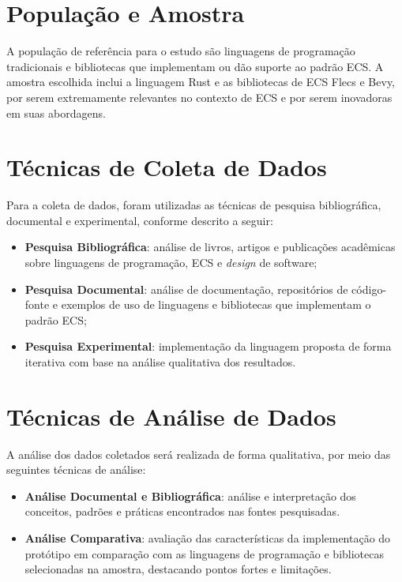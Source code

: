 \section{População e Amostra}

A população de referência para o estudo são linguagens de programação tradicionais e bibliotecas que implementam ou dão suporte ao padrão ECS. A amostra escolhida inclui a linguagem Rust e as bibliotecas de ECS Flecs e Bevy, por serem extremamente relevantes no contexto de ECS e por serem inovadoras em suas abordagens.

\section{Técnicas de Coleta de Dados}

Para a coleta de dados, foram utilizadas as técnicas de pesquisa bibliográfica, documental e experimental, conforme descrito a seguir:

\begin{itemize}
    \item \textbf{Pesquisa Bibliográfica}: análise de livros, artigos e publicações acadêmicas sobre linguagens de programação, ECS e \textit{design} de software;
    \item \textbf{Pesquisa Documental}: análise de documentação, repositórios de código-fonte e exemplos de uso de linguagens e bibliotecas que implementam o padrão ECS;
    \item \textbf{Pesquisa Experimental}: implementação da linguagem proposta de forma iterativa com base na análise qualitativa dos resultados.
\end{itemize}

\section{Técnicas de Análise de Dados}

A análise dos dados coletados será realizada de forma qualitativa, por meio das seguintes técnicas de análise:

\begin{itemize}
    \item \textbf{Análise Documental e Bibliográfica}: análise e interpretação dos conceitos, padrões e práticas encontrados nas fontes pesquisadas.
    \item \textbf{Análise Comparativa}: avaliação das características da implementação do protótipo em comparação com as linguagens de programação e bibliotecas selecionadas na amostra, destacando pontos fortes e limitações.
\end{itemize}

